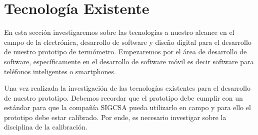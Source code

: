 \section{Tecnología Existente}

\par \noindent
En esta sección investigaremos sobre las tecnologías a nuestro alcance en el campo de la electrónica, desarrollo de software y diseño digital para el desarrollo de nuestro prototipo de termómetro. Empezaremos por el área de desarrollo de software, específicamente en el desarrollo de software móvil es decir software para teléfonos inteligentes o smartphones.











\par \noindent
Una vez realizada la investigación de las tecnologías existentes para el desarrollo de nuestro prototipo. Debemos recordar que el prototipo debe cumplir con un estándar para que la compañía SIGCSA pueda utilizarlo en campo y para ello el prototipo debe estar calibrado. Por ende, es necesario investigar sobre la disciplina de la calibración.
